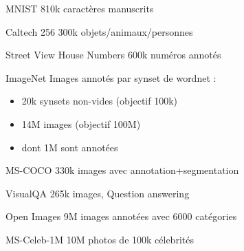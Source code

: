 \begin{frame}{MNIST}
  810k caractères manuscrits
\end{frame}

\begin{frame}{Caltech 256}
  300k objets/animaux/personnes
\end{frame}

\begin{frame}{Street View House Numbers}
  600k numéros annotés
\end{frame}

\begin{frame}{ImageNet}
  Images annotés par synset de wordnet :
  \begin{itemize}
    \item 20k synsets non-vides (objectif 100k)
    \item 14M images (objectif 100M)
    \item dont 1M sont annotées
  \end{itemize}
\end{frame}

\begin{frame}{MS-COCO}
   330k images avec annotation+segmentation
\end{frame}

\begin{frame}{VisualQA}
  265k images, Question answering
\end{frame}

\begin{frame}{Open Images}
  9M images annotées avec 6000 catégories
\end{frame}

\begin{frame}{MS-Celeb-1M}
  10M photos de 100k célebrités
\end{frame}
